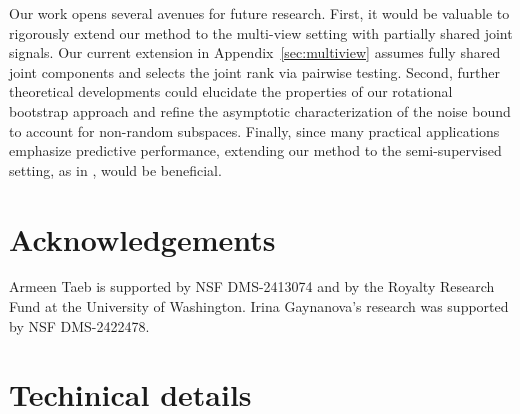 \documentclass{amsart}
\begin{document}
Our work opens several avenues for future research. First, it would be valuable to rigorously extend our method to the multi-view setting with partially shared joint signals. Our current extension in Appendix~\ref{sec:multiview} assumes fully shared joint components and selects the joint rank via pairwise testing. Second, further theoretical developments could elucidate the properties of our rotational bootstrap approach and refine the asymptotic characterization of the noise bound to account for non-random subspaces. Finally, since many practical applications emphasize predictive performance, extending our method to the semi-supervised setting, as in \citet{park2021sparse, palzer2022sjive}, would be beneficial.


\section{Acknowledgements}
Armeen Taeb is supported by NSF DMS-2413074 and by the Royalty Research Fund at the University of Washington. Irina Gaynanova's research was supported by NSF DMS-2422478.





\newpage
\appendix
\section{Techinical details}
\end{document}
